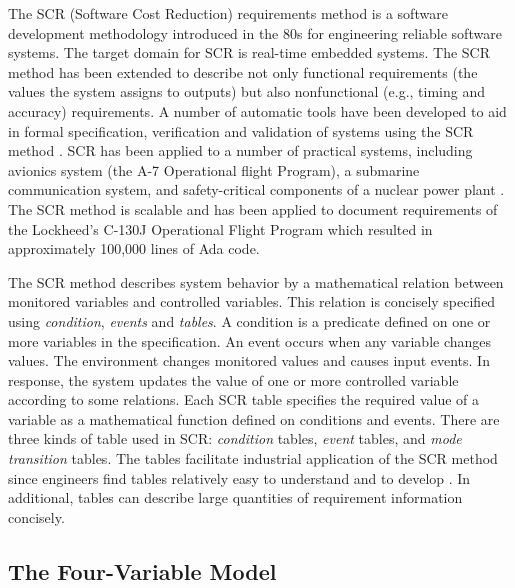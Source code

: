 \documentclass{entcs}
\begin{document}
The SCR (Software Cost Reduction) requirements method is a software development 
methodology introduced in the 80s \cite{Heninger78} for engineering reliable software systems. 
The target domain for SCR is real-time embedded systems.  
The SCR method has been extended to describe not only functional requirements (the values the 
system assigns to outputs) but also nonfunctional (e.g., timing and accuracy) requirements. 
A number of  automatic tools have been developed to aid in formal specification, verification and 
validation of systems using the SCR method \cite{Constance96}. 
SCR has been applied to a number of practical systems, including avionics system (the A-7 
Operational flight Program), a submarine communication system, and 
safety-critical components of a nuclear power plant \cite{Constance96}. The SCR method 
is scalable and has been applied to document requirements of the Lockheed's 
C-130J Operational Flight Program which resulted in 
approximately 100,000 lines of Ada code.  

The SCR method describes system behavior by a mathematical relation between monitored variables and controlled 
variables. This relation is concisely specified using {\it condition}, {\it events} and 
{\it tables}. A condition is a predicate 
defined on one or more variables in the specification. An event occurs when any variable changes values. 
The environment changes monitored values and causes input events. In response, the system updates 
the value of one or more controlled variable according to some relations.
Each SCR table specifies the required value of a variable as a mathematical function defined on conditions 
and events. There are three kinds of table used in SCR: {\it condition} tables, {\it event} tables, and {\it mode 
transition} tables. The tables facilitate industrial application of the SCR method since engineers
find tables relatively easy to understand and to develop \cite{Constance96}. In additional, tables 
can describe large quantities of requirement information concisely.

\subsection{The Four-Variable Model}
\end{document}
